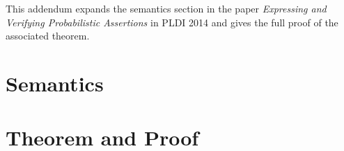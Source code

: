 \def\expandedversion{1}

This addendum expands the semantics section in the paper \textit{Expressing
and Verifying Probabilistic Assertions} in PLDI 2014 and gives the
full proof of the associated theorem.

\section{Semantics}


\section{Theorem and Proof}

